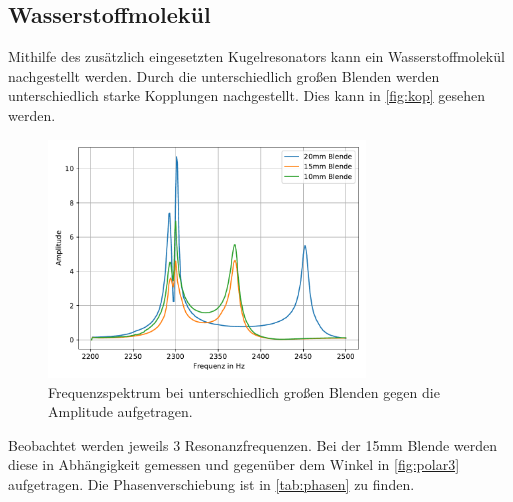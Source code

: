 \subsection{Wasserstoffmolekül}
Mithilfe des zusätzlich eingesetzten Kugelresonators kann ein Wasserstoffmolekül nachgestellt werden. Durch die unterschiedlich großen Blenden werden unterschiedlich
starke Kopplungen nachgestellt. Dies kann in \autoref{fig:kop} gesehen werden. 

\begin{figure}
    \centering
    \includegraphics[width=0.75\textwidth]{pic/101520.pdf}
    \caption{Frequenzspektrum bei unterschiedlich großen Blenden gegen die Amplitude aufgetragen.}
    \label{fig:kop}
  \end{figure}

\noindent
Beobachtet werden jeweils 3 Resonanzfrequenzen. Bei der 15mm Blende  werden diese in Abhängigkeit gemessen und gegenüber dem Winkel in \autoref{fig:polar3} aufgetragen. Die Phasenverschiebung ist in 
\autoref{tab:phasen} zu finden.

